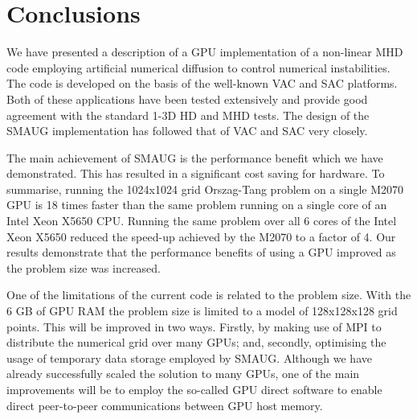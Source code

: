 \documentclass[final,1p]{elsarticle}
\begin{document}



\section{Conclusions}
We have presented a description of a GPU implementation of a non-linear MHD code employing artificial numerical diffusion to control numerical instabilities. The code  is developed on the basis of the well-known VAC  \cite{Toth1998} and SAC  \cite{Shelyag2008} platforms. Both of these applications have been tested extensively and provide good agreement with the standard 1-3D HD and MHD tests. The design of the SMAUG implementation has followed that of VAC and SAC very closely. 

The main achievement of SMAUG is the performance benefit which we have demonstrated. This has resulted in a significant cost saving for hardware. To summarise, running the 1024x1024 grid Orszag-Tang problem on a single M2070 GPU is 18 times faster than the same problem running on a single core of an Intel Xeon X5650 CPU. Running the same problem over all 6 cores of the Intel Xeon X5650 reduced the speed-up achieved by the M2070 to a factor of 4. Our results demonstrate that the performance benefits of using a GPU improved as the problem size was increased.

One of the limitations of the current code is related to the problem size. With the 6 GB  of GPU RAM the problem size is limited to a model of 128x128x128 grid points. This will be improved in two ways. Firstly, by making use of MPI to distribute the numerical grid over many GPUs; and, secondly, optimising the usage of temporary data storage employed by SMAUG.  Although we have already successfully scaled the solution to many GPUs, one of the main improvements will be to employ the so-called GPU direct software to enable direct peer-to-peer communications between GPU host memory. 
\end{document}

